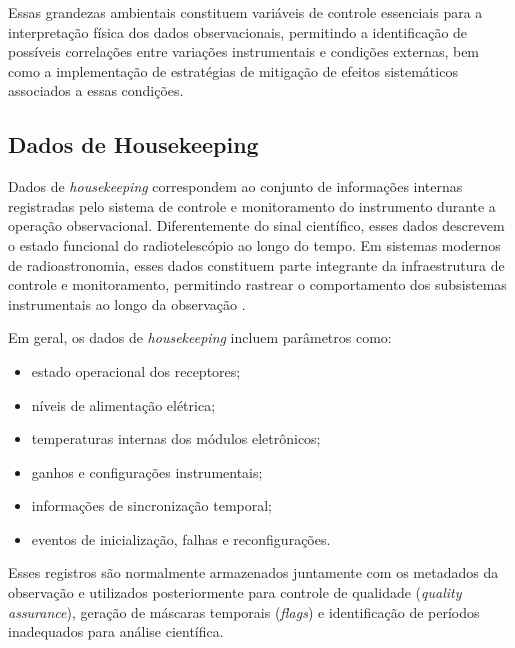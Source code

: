 Essas grandezas ambientais constituem variáveis de controle essenciais para a interpretação física dos dados observacionais, permitindo a identificação de possíveis correlações entre variações instrumentais e condições externas, bem como a implementação de estratégias de mitigação de efeitos sistemáticos associados a essas condições.

\subsection{Dados de Housekeeping}

Dados de \textit{housekeeping} correspondem ao conjunto de informações internas registradas pelo sistema de controle e monitoramento do instrumento durante a operação observacional. Diferentemente do sinal científico, esses dados descrevem o estado funcional do radiotelescópio ao longo do tempo. Em sistemas modernos de radioastronomia, esses dados constituem parte integrante da infraestrutura de controle e monitoramento, permitindo rastrear o comportamento dos subsistemas instrumentais ao longo da observação \cite{marais2015meerkat,woody2007control}.

Em geral, os dados de \textit{housekeeping} incluem parâmetros como:

\begin{itemize}

\item estado operacional dos receptores;

\item níveis de alimentação elétrica;

\item temperaturas internas dos módulos eletrônicos;

\item ganhos e configurações instrumentais;

\item informações de sincronização temporal;

\item eventos de inicialização, falhas e reconfigurações.

\end{itemize}

Esses registros são normalmente armazenados juntamente com os metadados da observação e utilizados posteriormente para controle de qualidade (\textit{quality assurance}), geração de máscaras temporais (\textit{flags}) e identificação de períodos inadequados para análise científica.

